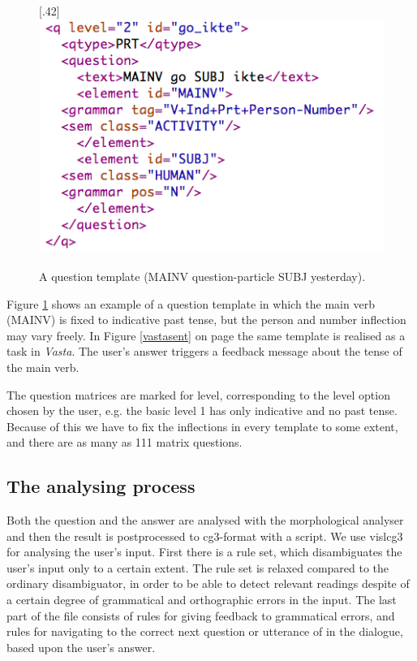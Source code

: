 \documentclass[11pt]{article}
\begin{document}
\begin{figure}[htbp]
\begin{center}
\scalebox{.42}[.42]{\includegraphics{presentation/img/sentencegenerator.png}}\\
\caption{A question template (MAINV question-particle SUBJ yesterday).}
\label{sentgen}
\end{center}
\end{figure}

Figure \ref{sentgen} shows an example of a question template in which the main verb (MAINV) is fixed to indicative past tense, but the person and number inflection may vary freely. In Figure \ref{vastasent} on page \pageref{vastasent} the same template is realised as a task in \textit{Vasta}. The user's answer triggers a feedback message about the tense of the main verb. 

The question matrices are marked for level, corresponding to the level option chosen by the user, e.g. the basic level 1 has only indicative and no past tense. Because of this we have to fix the inflections in every template to some extent, and there are as many as 111 matrix questions. \\
 
\subsection{The analysing process} 
Both the question and the answer are analysed with the morphological analyser and then the result is postprocessed to cg3-format with a script.
We use vislcg3 for analysing the user's input. First there is a rule set, which disambiguates the user's input only to a certain extent. The rule set is relaxed compared to the ordinary disambiguator, in order to be able to detect relevant readings despite of a certain degree of grammatical and orthographic errors in the input. The last part of the file consists of rules for giving feedback to grammatical errors, and rules for navigating to the correct next question or utterance of in the dialogue, based upon the user's answer.  
\end{document}
